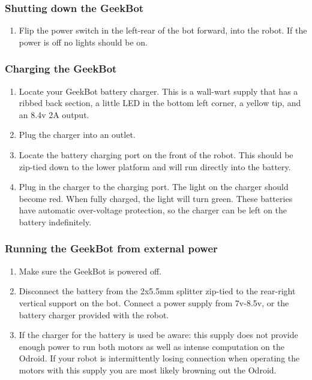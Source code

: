 \hypertarget{shutting-down-the-geekbot}{%
\subsubsection{Shutting down the
GeekBot}\label{shutting-down-the-geekbot}}

\begin{enumerate}
\def\labelenumi{\arabic{enumi}.}
\tightlist
\item
  Flip the power switch in the left-rear of the bot forward, into the
  robot. If the power is off no lights should be on.
\end{enumerate}

\hypertarget{charging-the-geekbot}{%
\subsubsection{Charging the GeekBot}\label{charging-the-geekbot}}

\begin{enumerate}
\def\labelenumi{\arabic{enumi}.}
\tightlist
\item
  Locate your GeekBot battery charger. This is a wall-wart supply that
  has a ribbed back section, a little LED in the bottom left corner, a
  yellow tip, and an 8.4v 2A output.
\item
  Plug the charger into an outlet.
\item
  Locate the battery charging port on the front of the robot. This
  should be zip-tied down to the lower platform and will run directly
  into the battery.
\item
  Plug in the charger to the charging port. The light on the charger
  should become red. When fully charged, the light will turn green.
  These batteries have automatic over-voltage protection, so the charger
  can be left on the battery indefinitely.
\end{enumerate}

\hypertarget{running-the-geekbot-from-external-power}{%
\subsubsection{Running the GeekBot from external
power}\label{running-the-geekbot-from-external-power}}

\begin{enumerate}
\def\labelenumi{\arabic{enumi}.}
\tightlist
\item
  Make sure the GeekBot is powered off.
\item
  Disconnect the battery from the 2x5.5mm splitter zip-tied to the
  rear-right vertical support on the bot. Connect a power supply from
  7v-8.5v, or the battery charger provided with the robot.
\item
  If the charger for the battery is used be aware: this supply does not
  provide enough power to run both motors as well as intense computation
  on the Odroid. If your robot is intermittently losing connection when
  operating the motors with this supply you are most likely browning out
  the Odroid.
\end{enumerate}

